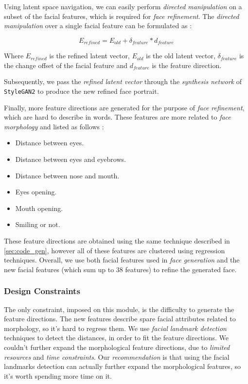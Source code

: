 Using latent space navigation, we can easily perform \emph{directed manipulation} on a subset of the facial features, which is required for \emph{face refinement}. The \emph{directed manipulation} over a single facial feature can be formulated as :

\begin{equation}
    E_{refined} = E_{old} + \delta_{feature} * d_{feature}
\end{equation}

Where $E_{refined}$ is the refined latent vector, $E_{old}$ is the old latent vector, $\delta_{feature}$ is the change offset of the facial feature and $d_{feature}$ is the feature direction.

Subsequently, we pass the \emph{refined latent vector} through the \emph{synthesis network} of \texttt{StyleGAN2} to produce the new refined face portrait.

Finally, more feature directions are generated for the purpose of \emph{face refinement}, which are hard to describe in words. These features are more related to \emph{face morphology} and listed as follows :
\begin{itemize}
    \item Distance between eyes.
    \item Distance between eyes and eyebrows.
    \item Distance between nose and mouth.
    \item Eyes opening.
    \item Mouth opening.
    \item Smiling or not.
\end{itemize}

These feature directions are obtained using the same technique described in \ref{sec:code_gen}, however all of these features are clustered using regression techniques. Overall, we use both facial features used in \emph{face generation} and the new facial features (which sum up to $38$ features) to refine the generated face.

\subsubsection{Design Constraints}

The only constraint, imposed on this module, is the difficulty to generate the feature directions. The new features describe spare facial attributes related to morphology, so it's hard to regress them. We use \emph{facial landmark detection} techniques to detect the distances, in order to fit the feature directions. We couldn't further expand the morphological feature directions, due to \emph{limited resources} and \emph{time constraints}. Our \emph{recommendation} is that using the facial landmarks detection can actually further expand the morphological features, so it's worth spending more time on it.
